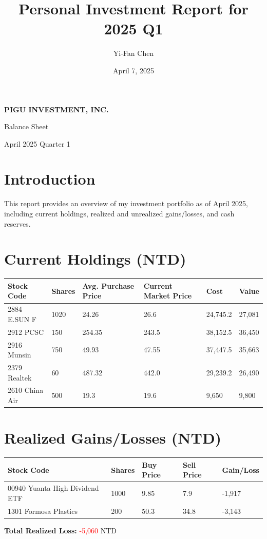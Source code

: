 \documentclass[a4paper,12pt]{article}
\title{\textbf{Personal Investment Report for 2025 Q1}}
\author{Yi-Fan Chen}
\date{April 7, 2025}
\begin{document}
\begin{titlepage}
    \centering
    \vspace*{\fill}
    {\Huge \textbf{PIGU INVESTMENT, INC.} \par}
    \vspace{1.5cm}
    {\LARGE Balance Sheet \par}
    \vspace{2cm}
    {\Large April 2025 Quarter 1 \par}
    \vspace*{\fill}
\end{titlepage}


\section{Introduction}
This report provides an overview of my investment portfolio as of April 2025, including current holdings, realized and unrealized gains/losses, and cash reserves.

\section{Current Holdings (NTD)}
\begin{longtable}{llllll}
    \toprule
    Stock Code & Shares & Avg. Purchase Price & Current Market Price & Cost & Value \\
    \midrule
    2884 E.SUN F      & 1020 & 24.26 & 26.6  & 24,745.2 & 27,081 \\
    2912 PCSC         & 150  & 254.35 & 243.5 & 38,152.5 & 36,450 \\
    2916 Munsin       & 750  & 49.93 & 47.55 & 37,447.5 & 35,663 \\
    2379 Realtek      & 60   & 487.32 & 442.0 & 29,239.2 & 26,490 \\
    2610 China Air    & 500  & 19.3   & 19.6  & 9,650   & 9,800 \\
    \bottomrule
\end{longtable}

\section{Realized Gains/Losses (NTD)}
\begin{longtable}{lllll}
    \toprule
    Stock Code & Shares & Buy Price & Sell Price & Gain/Loss \\
    \midrule
    00940 Yuanta High Dividend ETF & 1000 & 9.85 & 7.9  & -1,917 \\
    1301 Formosa Plastics          & 200  & 50.3 & 34.8 & -3,143 \\
    \bottomrule
\end{longtable}
\textbf{Total Realized Loss:} \textcolor{red}{-5,060} NTD
\end{document}
